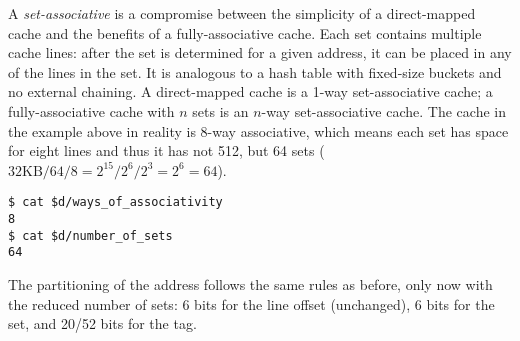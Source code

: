A \textit{set-associative} is a compromise between the simplicity of a
direct-mapped cache and the benefits of a fully-associative cache.  Each set
contains multiple cache lines: after the set is determined for a given address,
it can be placed in any of the lines in the set.  It is analogous to a hash
table with fixed-size buckets and no external chaining.  A direct-mapped cache
is a 1-way set-associative cache; a fully-associative cache with $n$ sets is an
$n$-way set-associative cache.  The cache in the example above in reality is
8-way associative, which means each set has space for eight lines and thus it
has not 512, but 64 sets ($32\text{KB} / 64 / 8 = 2^{15} / 2^6 / 2^3 = 2^6 =
64$).

\begin{lstlisting}
$ cat $d/ways_of_associativity
8
$ cat $d/number_of_sets
64
\end{lstlisting}

The partitioning of the address follows the same rules as before, only now with
the reduced number of sets: 6 bits for the line offset (unchanged), 6 bits for
the set, and 20/52 bits for the tag.

